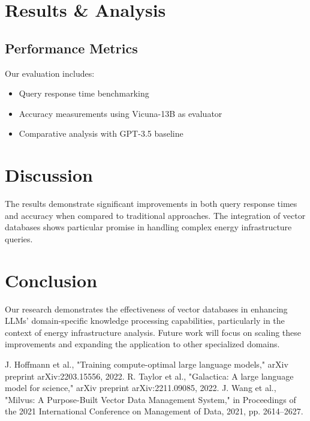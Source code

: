 \documentclass[conference]{IEEEtran}
\begin{document}
\section{Results \& Analysis}
\subsection{Performance Metrics}
Our evaluation includes:
\begin{itemize}
\item Query response time benchmarking
\item Accuracy measurements using Vicuna-13B as evaluator
\item Comparative analysis with GPT-3.5 baseline
\end{itemize}

\section{Discussion}
The results demonstrate significant improvements in both query response times and accuracy when compared to traditional approaches. The integration of vector databases shows particular promise in handling complex energy infrastructure queries.

\section{Conclusion}
Our research demonstrates the effectiveness of vector databases in enhancing LLMs' domain-specific knowledge processing capabilities, particularly in the context of energy infrastructure analysis. Future work will focus on scaling these improvements and expanding the application to other specialized domains.

\begin{thebibliography}{00}
 J. Hoffmann et al., "Training compute-optimal large language models," arXiv preprint arXiv:2203.15556, 2022.
 R. Taylor et al., "Galactica: A large language model for science," arXiv preprint arXiv:2211.09085, 2022.
 J. Wang et al., "Milvus: A Purpose-Built Vector Data Management System," in Proceedings of the 2021 International Conference on Management of Data, 2021, pp. 2614–2627.
\end{thebibliography}
\end{document}
